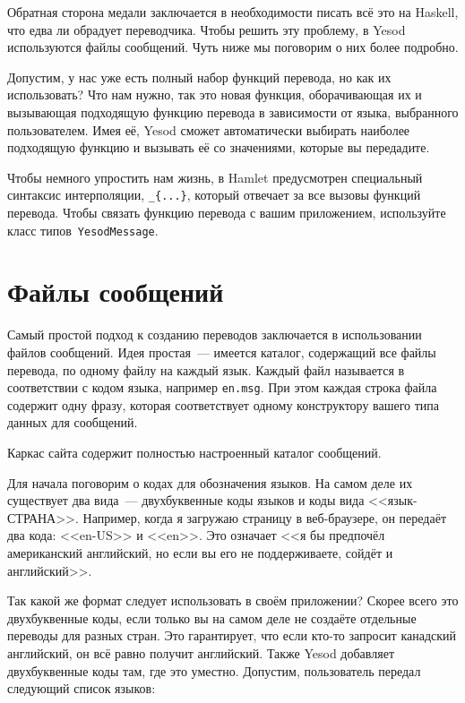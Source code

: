 Обратная сторона медали заключается в необходимости писать всё это на Haskell,
что едва ли обрадует переводчика. Чтобы решить эту проблему, в Yesod
используются файлы сообщений. Чуть ниже мы поговорим о них более подробно.

Допустим, у нас уже есть полный набор функций перевода, но как их использовать?
Что нам нужно, так это новая функция, оборачивающая их и вызывающая подходящую
функцию перевода в зависимости от языка, выбранного пользователем. Имея её,
Yesod сможет автоматически выбирать наиболее подходящую функцию и вызывать её
со значениями, которые вы передадите.

Чтобы немного упростить нам жизнь, в Hamlet предусмотрен специальный синтаксис
интерполяции, \lstinline'_{...}', который отвечает за все вызовы функций
перевода. Чтобы связать функцию перевода с вашим приложением, используйте класс
типов~\lstinline'YesodMessage'.

\section{Файлы сообщений}

Самый простой подход к созданию переводов заключается в использовании файлов
сообщений. Идея простая~--- имеется каталог, содержащий все файлы перевода, по
одному файлу на каждый язык. Каждый файл называется в соответствии с кодом
языка, например \texttt{en.msg}. При этом каждая строка файла содержит одну
фразу, которая соответствует одному конструктору вашего типа данных для
сообщений.

\begin{remark}
    Каркас сайта содержит полностью настроенный каталог сообщений.
\end{remark}

Для начала поговорим о кодах для обозначения языков. На самом деле их
существует два вида~--- двухбуквенные коды языков и коды вида <<язык-СТРАНА>>.
Например, когда я загружаю страницу в веб-браузере, он передаёт два кода:
<<en-US>> и <<en>>. Это означает <<я бы предпочёл американский английский, но
если вы его не поддерживаете, сойдёт и английский>>.

Так какой же формат следует использовать в своём приложении? Скорее всего это
двухбуквенные коды, если только вы на самом деле не создаёте отдельные переводы
для разных стран. Это гарантирует, что если кто-то запросит канадский
английский, он всё равно получит английский. Также Yesod добавляет
двухбуквенные коды там, где это уместно. Допустим, пользователь передал
следующий список языков:

